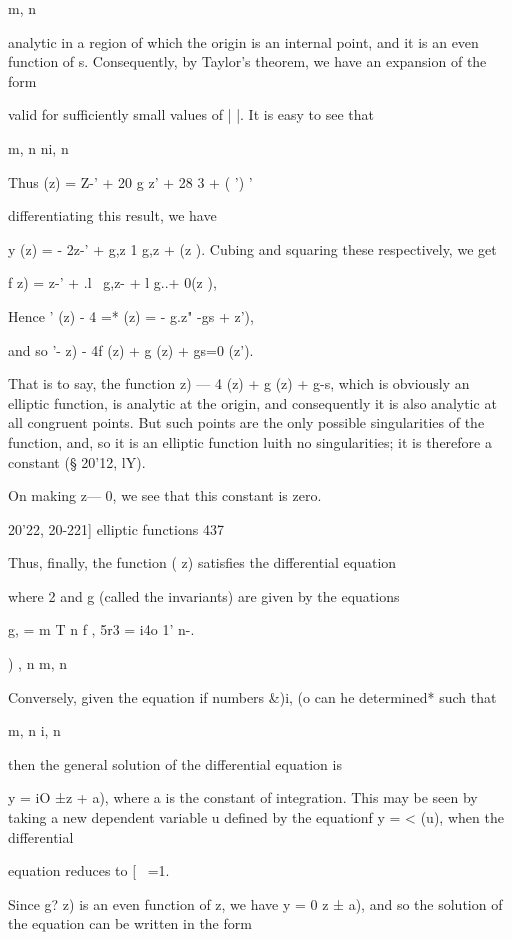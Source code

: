{m, n 

analytic in a region of which the origin is an internal point, and it is an 
even function of s. Consequently, by Taylor's theorem, we have an expansion 
of the form 

valid for sufficiently small values of |   |. It is easy to see that 

m, n ni, n 

Thus   (z) = Z-' + 20 g z' + 28  3  +   ( ') ' 

differentiating this result, we have 

 y (z) = - 2z-' +   g,z   1 g,z  + (z ). 
Cubing and squaring these respectively, we get 

f  z) = z-' + .l~ g,z-  + l g..+ 0(z ), 

Hence  '  (z) - 4 =* (z) = - g.z" -gs +  z'), 

and so  '-  z) - 4f (z) + g  (z) + gs=0 (z'). 

That is to say, the function     z) — 4   (z) + g  (z) + g-s, which is 
obviously an elliptic function, is analytic at the origin, and consequently 
it is also analytic at all congruent points. But such points are the only 
possible singularities of the function, and, so it is an elliptic function luith 
no singularities; it is therefore a constant (§ 20'12, lY). 

On making z— 0, we see that this constant is zero. 



20'22, 20-221] elliptic functions 437 

Thus, finally, the function (  z) satisfies the differential equation 

where  2 and g  (called the invariants) are given by the equations 

g, = m T n f , 5r3 = i4o 1' n-.  

) , n m, n 

Conversely, given the equation 
if numbers \&)i, (o  can he determined* such that 

m, n  i, n 

then the general solution of the differential equation is 

y = iO ±z + a), 
where a is the constant of integration. This may be seen by taking a new 
dependent variable u defined by the equationf y = <  (u), when the differential 

equation reduces to [ \ =1. 

Since g?  z) is an even function of z, we have y =  0 z ± a), and so the 
solution of the equation can be written in the form 

}
